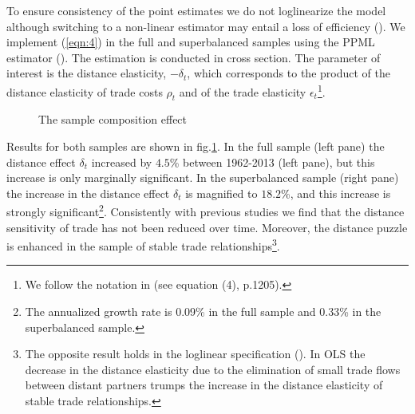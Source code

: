 \documentclass[12pt,twoside,a4paper,notitlepage]{article}
\begin{document}
To ensure consistency of the point estimates we do not loglinearize the model although switching to a non-linear estimator may entail a loss of efficiency (\cite{Manning1999}).
We implement (\ref{eqn:4}) in the full and superbalanced samples using the PPML estimator (\cite{SantosSilva2006}).
The estimation is conducted in cross section.
The parameter of interest is the distance elasticity, $-\delta_t$, which corresponds to the product of the distance elasticity of trade costs $\rho_t$ and of the trade elasticity $\epsilon_t$\footnote{We follow the notation in \cite{Head2013} (see equation (4), p.1205).}.


\begin{figure}[h!]
\caption{The sample composition effect \label{fig:compsample}}
\begin{center}
\setlength{\fboxrule}{1pt} %
\setlength{\fboxsep}{.1in} %
\end{center}
\end{figure}

Results for both samples are shown in fig.\ref{fig:compsample}.
In the full sample (left pane) the distance effect $\delta_t$ increased by $4.5$\% between 1962-2013 (left pane), but this increase is only marginally significant.
In the superbalanced sample (right pane) the increase in the distance effect $\delta_t$ is magnified to $18.2$\%, and this increase is strongly significant\footnote{The annualized growth rate is 0.09\% in the full sample and 0.33\% in the superbalanced sample.}.
Consistently with previous studies we find that the distance sensitivity of trade has not been reduced over time.
Moreover, the distance puzzle is enhanced in the sample of stable trade relationships\footnote{The opposite result holds in the loglinear specification (\cite{Head2013}).
In OLS the decrease in the distance elasticity due to the elimination of small trade flows between distant partners trumps the increase in the distance elasticity of stable trade relationships.}.
\end{document}
